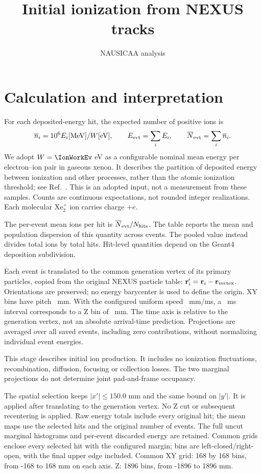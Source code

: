 \documentclass[10pt,a4paper]{article}
\title{Initial ionization from NEXUS tracks}
\author{NAUSICAA analysis}\date{}
\begin{document}
\maketitle
\section{Calculation and interpretation}
For each deposited-energy hit, the expected number of positive ions is
\[
 \overline n_i=10^6 E_i[\mathrm{MeV}]/W[\mathrm{eV}],\qquad
 E_{\rm evt}=\sum_i E_i,\qquad \overline N_{\rm evt}=\sum_i\overline n_i.
\]
We adopt $W=\IonWorkEv$ eV as a configurable nominal mean energy per electron--ion
pair in gaseous xenon. It describes the partition of deposited energy between
ionization and other processes, rather than the atomic ionization threshold;
see Ref.~\cite{Serra:2014zda}. This is an adopted input, not a measurement from these samples.
Counts are continuous expectations, not rounded integer realizations. Each
molecular $\mathrm{Xe}_2^+$ ion carries charge $+e$.

The per-event mean ions per hit is $\overline N_{\rm evt}/N_{\rm hits}$.
The table reports the mean and population dispersion of this quantity across
events. The pooled value instead divides total ions by total hits. Hit-level
quantities depend on the Geant4 deposition subdivision.

Each event is translated to the common generation vertex of its primary
particles, copied from the original NEXUS particle table:
$\mathbf r'_i=\mathbf r_i-\mathbf r_{\rm vertex}$. Orientations are preserved;
no energy barycenter is used to define the origin.
XY bins have pitch \IonPitchMm~mm. With the configured uniform speed
\IonSpeedMmMs~mm/ms, a \IonFrameMs~ms interval corresponds to a Z bin of
\IonZBinMm~mm. The time axis is relative to the generation vertex, not an absolute
arrival-time prediction. Projections are averaged over all saved events,
including zero contributions, without normalizing individual event energies.

This stage describes initial ion production. It includes no ionization
fluctuations, recombination, diffusion, focusing or collection losses.
The two marginal projections do not determine joint pad-and-frame occupancy.

\par The spatial selection keeps $|x'|\leq 150.0$ mm and the same bound on $|y'|$. It is applied after translating to the generation vertex. No Z cut or subsequent recentering is applied. Raw energy totals include every original hit; the mean maps use the selected hits and the original number of events. The full uncut marginal histograms and per-event discarded energy are retained. Common grids enclose every selected hit with the configured margin; bins are left-closed/right-open, with the final upper edge included.
Common XY grid: 168 by 168 bins, from -168 to 168 mm on each axis. Z: 1896 bins, from -1896 to 1896 mm.
\clearpage
\end{document}

